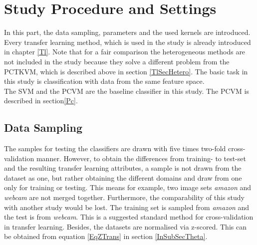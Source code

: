 \section{Study Procedure and Settings}\label{EmSecStudy}
In this part, the data sampling, parameters and the used kernels are introduced.
Every transfer learning method, which is used in the study is already introduced in chapter \ref{Tl}.
Note that for a fair comparison the heterogeneous methods are not included in the study because they solve a different problem from the \acs{PCTKVM}, which is described above in section \ref{TlSecHetero}.
The basic task in this study is classification with data from the same feature space.\\
The \ac{SVM} and the \acl{PCVM} are the baseline classifier in this study.
The \acs{PCVM} is described in section\ref{Pc}.\\

\subsection{Data Sampling}\label{EmSubSecDataS}
The samples for testing the classifiers are drawn with five times two-fold cross-validation manner.
However, to obtain the differences from training- to test-set and the resulting transfer learning attributes, a sample is not drawn from the dataset as one, but rather obtaining the different domains and draw from one only for training or testing.
This means for example, two image sets \textit{amazon} and \textit{webcam} are not merged together.
Furthermore, the comparability of this study with another study would be lost.
The training set is sampled from \textit{amazon} and the test is from \textit{webcam}.
This is a suggested standard method for cross-validation in transfer learning.\cite{Gong.}
Besides, the datasets are normalised via z-scored.
This can be obtained from equation \ref{EqZTrans} in section \ref{InSubSecTheta}.
